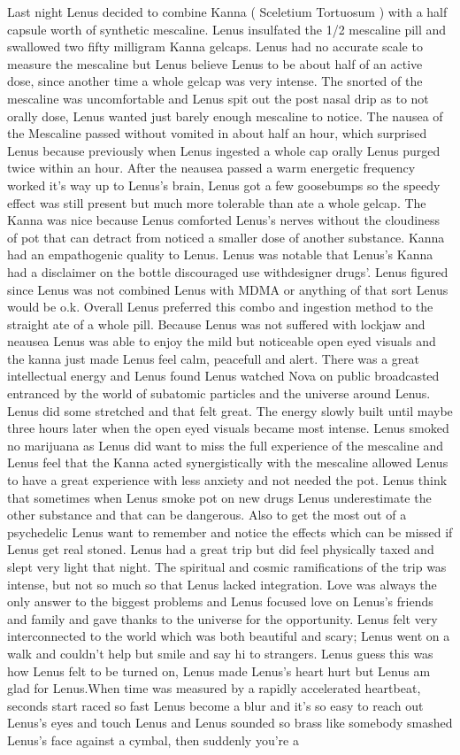 \documentclass[12pt]{book}
\begin{document}
Last night Lenus decided to combine Kanna ( Sceletium Tortuosum ) with a half capsule worth of synthetic mescaline. Lenus insulfated the 1/2 mescaline pill and swallowed two fifty milligram Kanna gelcaps. Lenus had no accurate scale to measure the mescaline but Lenus believe Lenus to be about half of an active dose, since another time a whole gelcap was very intense. The snorted of the mescaline was uncomfortable and Lenus spit out the post nasal drip as to not orally dose, Lenus wanted just barely enough mescaline to notice. The nausea of the Mescaline passed without vomited in about half an hour, which surprised Lenus because previously when Lenus ingested a whole cap orally Lenus purged twice within an hour. After the neausea passed a warm energetic frequency worked it's way up to Lenus's brain, Lenus got a few goosebumps so the speedy effect was still present but much more tolerable than ate a whole gelcap. The Kanna was nice because Lenus comforted Lenus's nerves without the cloudiness of pot that can detract from noticed a smaller dose of another substance. Kanna had an empathogenic quality to Lenus. Lenus was notable that Lenus's Kanna had a disclaimer on the bottle discouraged use withdesigner drugs'. Lenus figured since Lenus was not combined Lenus with MDMA or anything of that sort Lenus would be o.k. Overall Lenus preferred this combo and ingestion method to the straight ate of a whole pill. Because Lenus was not suffered with lockjaw and neausea Lenus was able to enjoy the mild but noticeable open eyed visuals and the kanna just made Lenus feel calm, peacefull and alert. There was a great intellectual energy and Lenus found Lenus watched Nova on public broadcasted entranced by the world of subatomic particles and the universe around Lenus. Lenus did some stretched and that felt great. The energy slowly built until maybe three hours later when the open eyed visuals became most intense. Lenus smoked no marijuana as Lenus did want to miss the full experience of the mescaline and Lenus feel that the Kanna acted synergistically with the mescaline allowed Lenus to have a great experience with less anxiety and not needed the pot. Lenus think that sometimes when Lenus smoke pot on new drugs Lenus underestimate the other substance and that can be dangerous. Also to get the most out of a psychedelic Lenus want to remember and notice the effects which can be missed if Lenus get real stoned. Lenus had a great trip but did feel physically taxed and slept very light that night. The spiritual and cosmic ramifications of the trip was intense, but not so much so that Lenus lacked integration. Love was always the only answer to the biggest problems and Lenus focused love on Lenus's friends and family and gave thanks to the universe for the opportunity. Lenus felt very interconnected to the world which was both beautiful and scary; Lenus went on a walk and couldn't help but smile and say hi to strangers. Lenus guess this was how Lenus felt to be turned on, Lenus made Lenus's heart hurt but Lenus am glad for Lenus.When time was measured by a rapidly accelerated heartbeat, seconds start raced so fast Lenus become a blur and it's so easy to reach out Lenus's eyes and touch Lenus and Lenus sounded so brass like somebody smashed Lenus's face against a cymbal, then suddenly you're a 
\end{document}
